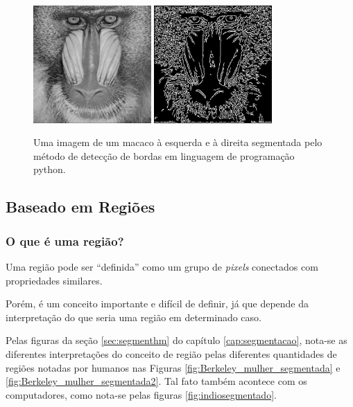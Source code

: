 \begin{figure}[!htb]
 \centering
 \def\baselinestretch{1}\small\normalsize
 \includegraphics[width=0.4\textwidth]{img/stf-smandrill.jpg}\qquad
 \includegraphics[width=0.4\textwidth]{img/stf-smandrill-edgedetect.jpg} 
 \caption{\label{fig:smandrill} Uma imagem de um macaco \citep{stanford} à esquerda e à direita segmentada pelo método de detecção de bordas em linguagem de programação python.}
\end{figure}


\subsection{Baseado em Regiões}
\subsubsection*{O que é uma região?}
Uma região pode ser “definida” como um grupo de \textit{pixels} conectados com propriedades similares.

Porém, é um conceito importante e difícil de definir, já que depende da interpretação do que seria uma região  em determinado caso.

Pelas figuras da seção \ref{sec:segmenthm} do capítulo \ref{cap:segmentacao}, nota-se as diferentes interpretações do conceito de região pelas diferentes quantidades de regiões notadas por humanos nas Figuras \ref{fig:Berkeley_mulher_segmentada} e \ref{fig:Berkeley_mulher_segmentada2}. Tal fato também acontece com os computadores, como nota-se pelas figuras \ref{fig:indiosegmentado}.

